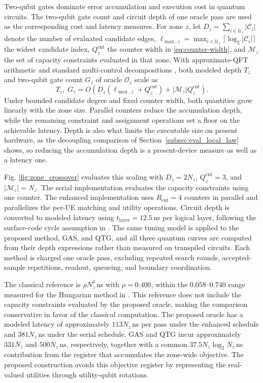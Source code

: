 Two-qubit gates dominate error accumulation and execution cost in quantum circuits. The two-qubit gate count and circuit depth of one oracle pass are used as the corresponding cost and latency measures. For zone $z$, let $D_z=\sum_{i\in\mathcal U_z}|\mathcal C_i|$ denote the number of evaluated candidate edges, $\ell_{\max,z}= \max_{i\in\mathcal U_z}\lceil\log_2|\mathcal C_i|\rceil$ the widest candidate index, $Q_z^{\mathrm{cnt}}$ the counter width in \eqref{eq:counter-width}, and $\mathcal M_z$ the set of capacity constraints evaluated in that zone. With approximate-QFT arithmetic \cite{coppersmith1994} and standard multi-control decompositions \cite{maslov2016}, both modeled depth $T_z$ and two-qubit gate count $G_z$ of oracle $\mathcal O_z$ scale as
\begin{equation}
T_z,\;G_z=O\!\left(D_z\left(\ell_{\max,z}+Q_z^{\mathrm{cnt}}\right)+|\mathcal M_z|Q_z^{\mathrm{cnt}}\right).
\label{eq:zone_one_pass_cost}
\end{equation}
Under bounded candidate degree and fixed counter width, both quantities grow linearly with the zone size. Parallel counters reduce the accumulation depth, while the remaining constraint and assignment operations set a floor on the achievable latency. Depth is also what limits the executable size on present hardware, as the decoupling comparison of Section~\ref{subsec:eval_local_law} shows, so reducing the accumulation depth is a present-device measure as well as a latency one.

Fig. \ref{fig:zone_crossover} evaluates this scaling with $D_z=2N_z$, $Q_z^{\mathrm{cnt}}=3$, and $|\mathcal M_z|=N_z$. The serial implementation evaluates the capacity constraints using one counter. The enhanced implementation uses $R_{\mathrm{cnt}}=4$ counters in parallel and parallelizes the per-UE matching and utility operations. Circuit depth is converted to modeled latency using $t_{\mathrm{layer}}=12.5\,$ns per logical layer, following the surface-code cycle assumption in \cite{campbell2019}. The same timing model is applied to the proposed method, GAS, and QTG, and all three quantum curves are computed from their depth expressions rather than measured on transpiled circuits. Each method is charged one oracle pass, excluding repeated search rounds, accepted-sample repetitions, readout, queueing, and boundary coordination.

The classical reference is $\rho N_z^3\,$ns with $\rho=0.400$, within the $0.058$--$0.740$ range measured for the Hungarian method \cite{kuhn1955} in \cite{jang2025cqf}. This reference does not include the capacity constraints evaluated by the proposed oracle, making the comparison conservative in favor of the classical computation. The proposed oracle has a modeled latency of approximately $113N_z\,$ns per pass under the enhanced schedule and $381N_z\,$ns under the serial schedule. GAS and QTG incur approximately $331N_z$ and $500N_z\,$ns, respectively, together with a common $37.5N_z\log_2N_z\,$ns contribution from the register that accumulates the zone-wide objective. The proposed construction avoids this objective register by representing the real-valued utilities through utility-qubit rotations.

